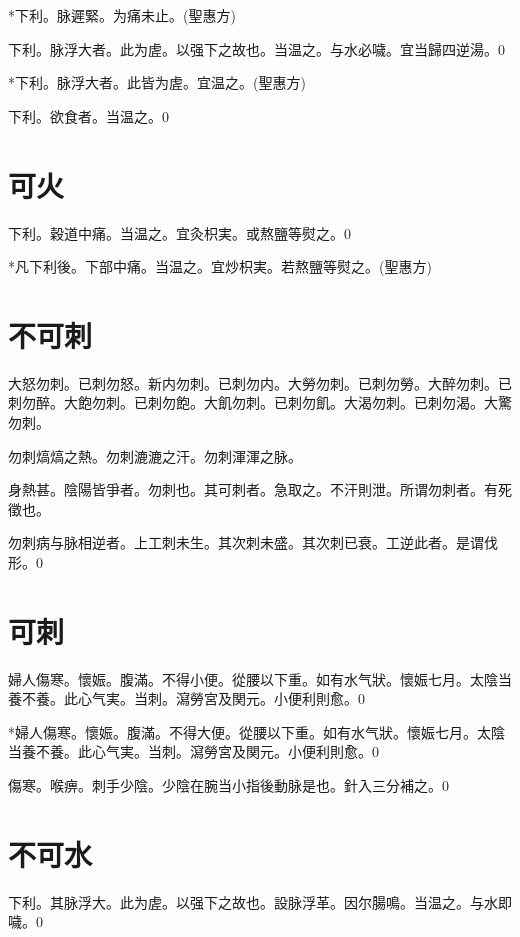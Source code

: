 \documentclass[b5paper,twoside,zihao=-4,UTF8]{ctexbook}
\begin{document}
*下利。脉遲緊。为痛未止。(聖惠方)

下利。脉浮大者。此为虗。以强下之故也。当温之。与水必噦。{宜当歸四逆湯。}0

*下利。脉浮大者。此皆为虗。宜温之。(聖惠方)

下利。欲食者。当温之。0

\chapter{可火}

下利。穀道中痛。当温之。宜灸枳実。或熬鹽等熨之。0

*凡下利後。下部中痛。当温之。宜炒枳実。若熬鹽等熨之。(聖惠方)

\chapter{不可刺}

大怒勿刺。{已刺勿怒。}新内勿刺。{已刺勿内。}大勞勿刺。{已刺勿勞。}大醉勿刺。{已刺勿醉。}大飽勿刺。{已刺勿飽。大飢勿刺。已刺勿飢。}大渴勿刺。{已刺勿渴。}大驚勿刺。

勿刺熇熇之熱。勿刺漉漉之汗。勿刺渾渾之脉。

身熱甚。陰陽皆爭者。勿刺也。其可刺者。急取之。不汗則泄。所谓勿刺者。有死徵也。

勿刺病与脉相逆者。上工刺未生。其次刺未盛。其次刺已衰。工逆此者。是谓伐形。0

\chapter{可刺}

婦人傷寒。懷娠。腹滿。不得小便。從腰以下重。如有水气狀。懷娠七月。太陰当養不養。此心气実。当刺。瀉勞宮及関元。小便利則愈。0

*婦人傷寒。懷娠。腹滿。不得大便。從腰以下重。如有水气狀。懷娠七月。太陰当養不養。此心气実。当刺。瀉勞宮及関元。小便利則愈。0

傷寒。喉痹。刺手少陰。少陰在腕当小指後動脉是也。針入三分補之。0

\chapter{不可水}

下利。其脉浮大。此为虗。以强下之故也。設脉浮革。因尔腸鳴。当温之。与水即噦。0
\end{document}
